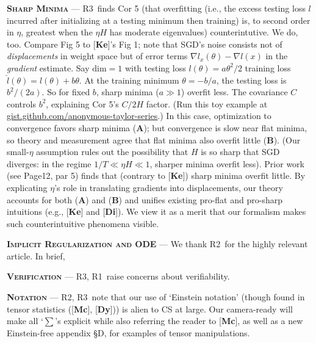 \documentclass{article}
\newcommand{\Ra}{\textmd{\textsf{\color{purple!50} {R1}}}}
\newcommand{\Rb}{\textmd{\textsf{\color{green!50}  {R2}}}}
\newcommand{\Rc}{\textmd{\textsf{\color{blue!50}   {R3}}}}
\newcommand{\cor}[1]{\textmd{\textsf{Cor #1}}}
\newcommand{\pag}[1]{\textmd{\textsf{Page#1}}}
\newcommand{\fig}[1]{\textmd{\textsf{Fig #1}}}
\newcommand{\cit}[1]{[\textbf{#1}]}
\newcommand{\moosect}[1]{\par\textsc{\textbf{#1}} ---}
\newcommand{\offive}[1]{
    {\tiny
        \raisebox{-0.04cm}{\color{gray}\scalebox{2.5}{$\substack{
            \ifthenelse{\equal{#1}{0}}{{\color{moor}\blacksquare}}{\square} 
        }$}}%
        \raisebox{0.04cm}{$\substack{
            \IfSubStr{#1}{1}{{\color{moor}\blacksquare}}{\square}   
            \IfSubStr{#1}{1}{{\color{moor}\blacksquare}}{\square} \\
            \IfSubStr{#1}{2}{{\color{moor}\blacksquare}}{\square}    
            \IfSubStr{#1}{2}{{\color{moor}\blacksquare}}{\square}    
        }$}%
    }%
}
\begin{document}
\moosect{Sharp Minima}
    \Rc\ finds \cor{5} ({\small that overfitting
    (i.e., the excess testing loss $l$ incurred after initializing at a testing
    minimum then training) is, to second order in $\eta$, greatest
    when the $\eta H$ has moderate eigenvalues}) 
    counterintutive.  We do, too.
    Compare \fig{5\offive{1}} to \cit{Ke}'s \fig{1}; note that SGD's noise
    consists not of \emph{displacements} in weight space but of
    error terms $\nabla l_x(\theta)-\nabla l(x)$ in the \emph{gradient}
    estimate.  
    Say $\text{dim}=1$ with testing loss $l(\theta)=a \theta^2/2$ training loss
    $\hat l(\theta)=l(\theta)+b\theta$.  At the training minimum $\theta=-b/a$,
    the testing loss is $b^2/(2a)$.  So for fixed $b$, sharp minima ($a\gg 1$)
    overfit less.  The covariance $C$ controls $b^2$, explaining
    \cor{5}'s $C/2H$ factor.  (Run this toy example at \href{https://gist.github.com/anonymous-taylor-series/60ee7ca824e44a9e8f25e69ceb60995e}{gist.github.com/anonymous-taylor-series}.)
    In this case, optimization to convergence favors sharp minima
    (\textbf{A}); but convergence is slow near flat minima, so theory and
    measurement agree that flat minima also overfit little (\textbf{B}).  (Our
    small-$\eta$ assumption rules out the possibility that $H$ is so sharp that
    SGD diverges: in the regime $1/T \ll \eta H \ll 1$, sharper minima overfit
    less).
    Prior work (see \pag{12, par 5}) finds that (contrary to \cit{Ke}) sharp
    minima overfit little.  By explicating $\eta$'s role in translating
    gradients into displacements, our theory accounts for both (\textbf{A}) and
    (\textbf{B}) and unifies existing pro-flat and pro-sharp intuitions
    (e.g., \cit{Ke} and \cit{Di}).
    We view it as a merit that our formalism makes such counterintuitive
    phenomena visible.
    
\moosect{Implicit Regularization and ODE}
    We thank \Rb\ for the highly relevant article.  In brief,  
    
\moosect{Verification} \Rc,\Ra\ raise concerns about verifiability.

\moosect{Notation}
    \Rb,\Rc\ note that our use of `Einstein notation' (though found in tensor
    statistics (\cit{Mc}, \cit{Dy})) is alien to CS at large.  Our camera-ready
    will make all `$\sum$'s explicit while also referring the reader to
    \cit{Mc}, as well as a new Einstein-free appendix \S{D}, for examples of tensor manipulations.
\end{document}
